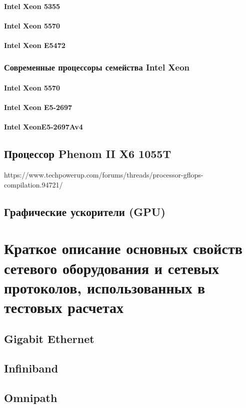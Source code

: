 \subsubsection{Intel Xeon 5355}
\subsubsection{Intel Xeon 5570}
\subsubsection{Intel Xeon E5472}


\subsection{Современные процессоры семейства Intel Xeon}
\subsubsection{Intel Xeon 5570}
\subsubsection{Intel Xeon E5-2697}
\subsubsection{Intel XeonE5-2697Av4}

\section{Процессор Phenom II X6 1055T}
https://www.techpowerup.com/forums/threads/processor-gflops-compilation.94721/

\section{Графические ускорители (GPU)}



\chapter{Краткое описание основных свойств сетевого оборудования и сетевых протоколов, использованных в тестовых расчетах} \label{AppendixB}

\section{Gigabit Ethernet}
\section{Infiniband}
\section{Omnipath}


